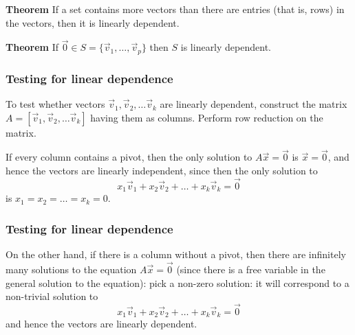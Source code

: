   \begin{frame}[fragile]
\textbf{Theorem}
 If a set contains more vectors than there are entries (that is, rows) 
 in the vectors, then it is linearly dependent.

%
%
\end{frame}

  \begin{frame}[fragile]
\textbf{Theorem}
 If $\vec{0} \in S = \{ \vec{v}_1, \dots , \vec{v}_p \}$ 
 then $S$ is linearly dependent.

%
%
%
%
\end{frame}

  \begin{frame}[fragile]\frametitle{Testing for linear dependence}
To test whether vectors $\vec{v}_1, \vec{v}_2, \dots \vec{v}_k$ are linearly 
dependent, construct the matrix $A=[\vec{v}_1, \vec{v}_2, \dots \vec{v}_k]$ having them as columns.  
Perform row reduction on the matrix.

If every column contains a pivot, then the only solution to $A \vec{x} = \vec{0}$
is $\vec{x}=\vec{0}$, and hence the vectors are linearly independent, since then
the only solution to 
\[
 x_1 \vec{v}_1 + x_2 \vec{v}_2  + \dots + x_k \vec{v}_k = \vec{0}
\]
is $x_1=x_2=\dots=x_k=0$.
\end{frame}

  \begin{frame}[fragile]\frametitle{Testing for linear dependence}
On the other hand, if there is a column without a pivot, then there are infinitely many 
solutions to the equation $A \vec{x} = \vec{0}$ (since there is a free 
variable in the general solution to the equation): pick a non-zero solution: it 
will correspond to a non-trivial solution to
\[
 x_1 \vec{v}_1 + x_2 \vec{v}_2  + \dots + x_k \vec{v}_k = \vec{0}
\]
and hence the vectors are linearly dependent.
\end{frame}

